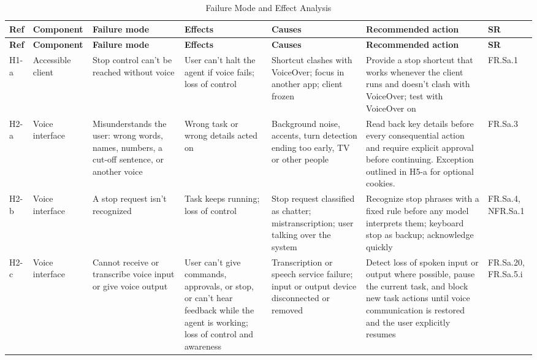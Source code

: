 \documentclass{article}
\begin{document}
\begin{landscape}
\footnotesize
\setlength{\tabcolsep}{3pt}
\begin{longtable}{>{\raggedright\arraybackslash}p{0.9cm}>{\raggedright\arraybackslash}p{1.7cm}>{\raggedright\arraybackslash}p{2.9cm}>{\raggedright\arraybackslash}p{2.7cm}>{\raggedright\arraybackslash}p{3cm}>{\raggedright\arraybackslash}p{4.6cm}>{\raggedright\arraybackslash}p{1.6cm}}
\caption{Failure Mode and Effect Analysis}\label{TblFMEA}\\
\toprule
\textbf{Ref} & \textbf{Component} & \textbf{Failure mode} & \textbf{Effects} & \textbf{Causes} & \textbf{Recommended action} & \textbf{SR}\\
\midrule
\endfirsthead
\toprule
\textbf{Ref} & \textbf{Component} & \textbf{Failure mode} & \textbf{Effects} & \textbf{Causes} & \textbf{Recommended action} & \textbf{SR}\\
\midrule
\endhead
\bottomrule
\endfoot
H1-a & Accessible client & Stop control can't be reached without voice & User can't halt the agent if voice fails; loss of control & Shortcut clashes with VoiceOver; focus in another app; client frozen & Provide a stop shortcut that works whenever the client runs and doesn't clash with VoiceOver; test with VoiceOver on & FR.Sa.1\\
H2-a & Voice interface & Misunderstands the user: wrong words, names, numbers, a cut-off sentence, or another voice & Wrong task or wrong details acted on & Background noise, accents, turn detection ending too early, TV or other people & Read back key details before every consequential action and require explicit approval before continuing. Exception outlined in H5-a for optional cookies. & FR.Sa.3\\
H2-b & Voice interface & A stop request isn't recognized & Task keeps running; loss of control & Stop request classified as chatter; mistranscription; user talking over the system & Recognize stop phrases with a fixed rule before any model interprets them; keyboard stop as backup; acknowledge quickly & FR.Sa.4, NFR.Sa.1\\
H2-c & Voice interface & Cannot receive or transcribe voice input or give voice output & User can't give commands, approvals, or stop, or can't hear feedback while the agent is working; loss of control and awareness & Transcription or speech service failure; input or output device disconnected or removed & Detect loss of spoken input or output where possible, pause the current task, and block new task actions until voice communication is restored and the user explicitly resumes  & FR.Sa.20, FR.Sa.5.i\\

\end{longtable}
\end{landscape}
\end{document}
